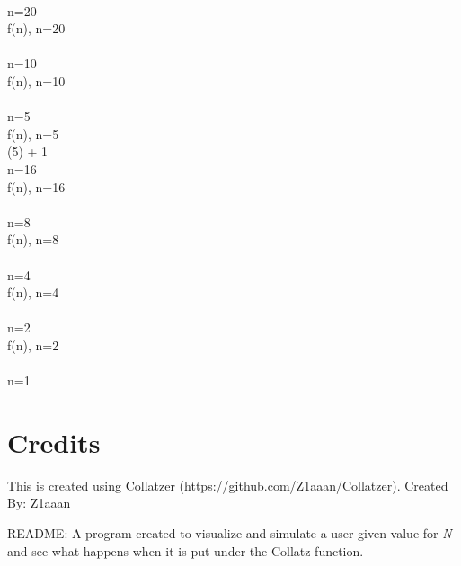 \documentclass{article}
\begin{document}
 \Rightarrow {} 
 \\ 
 \Rightarrow n=20
 \\[3mm] 
f(n), n=20
 \\ 
 \Rightarrow {} 
 \\ 
 \Rightarrow n=10
 \\[3mm] 
f(n), n=10
 \\ 
 \Rightarrow {} 
 \\ 
 \Rightarrow n=5
 \\[3mm] 
f(n), n=5
 \\ 
 (5) + 1
 \\ 
 \Rightarrow n=16
 \\[3mm] 
f(n), n=16
 \\ 
 \Rightarrow {} 
 \\ 
 \Rightarrow n=8
 \\[3mm] 
f(n), n=8
 \\ 
 \Rightarrow {} 
 \\ 
 \Rightarrow n=4
 \\[3mm] 
f(n), n=4
 \\ 
 \Rightarrow {} 
 \\ 
 \Rightarrow n=2
 \\[3mm] 
f(n), n=2
 \\ 
 \Rightarrow {} 
 \\ 
 \Rightarrow n=1
 \\[3mm] 

    \section{Credits}
    This is created using Collatzer (https://github.com/Z1aaan/Collatzer).
    Created By: Z1aaan
    
    README:
    A program created to visualize and simulate a user-given value for \textit{N} 
    and see what happens when it is put under the Collatz function.
    
\end{document}
